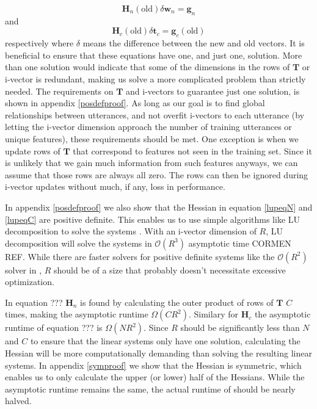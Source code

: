 \begin{equation}\label{lupeqN}
\mathbf{H}_n(\text{old}) \delta\mathbf{w}_n = \mathbf{g}_n
\end{equation}
and
\begin{equation}\label{lupeqC}
\mathbf{H}_c(\text{old}) \delta \mathbf{t}_c = \mathbf{g}_c(\text{old})
\end{equation}
respectively where $\delta$ means the difference between the new and old vectors. It is beneficial to ensure that these equations have one, and just one, solution. More than one solution would indicate that some of the dimensions in the rows of $\mathbf{T}$ or i-vector is redundant, making us solve a more complicated problem than strictly needed. The requirements on $\mathbf{T}$ and i-vectors to guarantee just one solution, is shown in appendix \ref{posdefproof}. As long as our goal is to find global relationships between utterances, and not overfit i-vectors to each utterance (by letting the i-vector dimension approach the number of training utterances or unique features), these requirements should be met. One exception is when we update rows of $\mathbf{T}$ that correspond to features not seen in the training set. Since it is unlikely that we gain much information from such features anyways, we can assume that those rows are always all zero. The rows can then be ignored during i-vector updates without much, if any, loss in performance.

In appendix \ref{posdefproof} we also show that the Hessian in equation \ref{lupeqN} and \ref{lupeqC} are positive definite. This enables us to use simple algorithms like LU decomposition to solve the systems \cite[p. 749]{cormen}. With an i-vector dimension of $R$, LU decomposition will solve the systems in $\mathcal{O}(R^3)$ asymptotic time CORMEN REF. While there are faster solvers for positive definite systems like the $\mathcal{O}(R^2)$ solver in \cite{tewfik1994fast}, $R$ should be of a size that probably doesn't necessitate excessive optimization.

In equation ??? $\mathbf{H}_n$ is found by calculating the outer product of rows of $\mathbf{T}$ $C$ times, making the asymptotic runtime $\Omega(CR^2)$. Similary for $\mathbf{H}_c$ the asymptotic runtime of equation ??? is  $\Omega(NR^2)$. Since $R$ should be significantly less than $N$ and $C$ to ensure that the linear systems only have one solution, calculating the Hessian will be more computationally demanding than solving the resulting linear systems. In appendix \ref{symproof} we show that the Hessian is symmetric, which enables us to only calculate the upper (or lower) half of the Hessians. While the asymptotic runtime remains the same, the actual runtime of should be nearly halved. 

